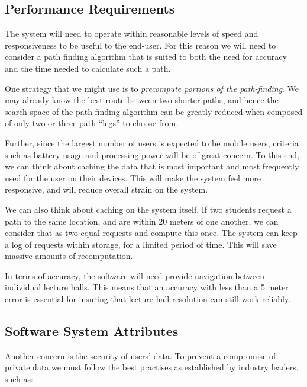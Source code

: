 \documentclass[10pt,a4paper]{article}
\begin{document}
		\subsection{Performance Requirements}

			The system will need to operate within reasonable levels of speed and
			responsiveness to be useful to the end-user. For this reason we will need
			to consider a path finding algorithm that is suited to both the need for
			accuracy and the time needed to calculate such a path.

			\medskip

			One strategy that we might use is to \textsl{precompute portions of the
			path-finding}. We may already know the best route between two shorter
			paths, and hence the search space of the path finding algorithm can be
			greatly reduced when composed of only two or three path ``legs'' to choose
			from.

			\medskip

			Further, since the largest number of users is expected to be mobile users,
			criteria such as battery usage and processing power will be of
			great concern. To this end, we can think about caching the data that is
			most important and most frequently used for the user on their devices.
			This will make the system feel more responsive, and will reduce overall
			strain on the system.

			\medskip

			We can also think about caching on the system itself. If two students
			request a path to the same location, and are within 20 meters of one
			another, we can consider that as two equal requests and compute this once.
			The system can keep a log of requests within storage, for a limited period
			of time. This will save massive amounts of recomputation.

			\medskip

			In terms of accuracy, the software will need provide navigation between
			individual lecture halls. This means that an accuracy with less than a 5
			meter error is essential for insuring that lecture-hall resolution can
			still work reliably.

		\subsection{Software System Attributes}

			Another concern is the security of users' data. To prevent a compromise of
			private data we must follow the best practises as established by industry
			leaders, such as:
\end{document}
